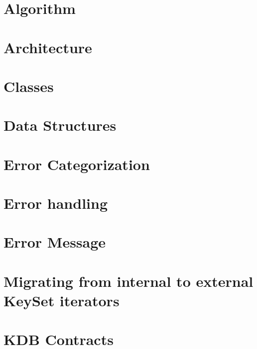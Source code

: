 \let\mypdfximage\pdfximage\def\pdfximage{\immediate\mypdfximage}\documentclass[twoside]{book}
\newcommand{\+}{\discretionary{\mbox{\scriptsize$\hookleftarrow$}}{}{}}
\begin{document}
\chapter{Algorithm}
\label{doc_dev_algorithm_md}

\chapter{Architecture}
\label{doc_dev_architecture_md}

\chapter{Classes}
\label{doc_dev_classes_md}

\chapter{Data Structures}
\label{doc_dev_data-structures_md}

\chapter{Error Categorization}
\label{doc_dev_error-categorization_md}

\chapter{Error handling}
\label{doc_dev_error-handling_md}

\chapter{Error Message}
\label{doc_dev_error-message_md}

\chapter{Migrating from internal to external Key\+Set iterators}
\label{doc_dev_iterators_md}

\chapter{KDB Contracts}
\label{doc_dev_kdb-contracts_md}

\end{document}

